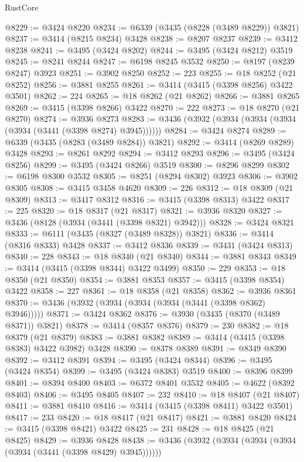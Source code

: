\begin{lexlean}{RustCore}
\begin{coremodule}
@8229 := @3424 @8220
@8234 := @6339 (@3435 (@8228 (@3489 @8229)) @3821)
@8237 := @3414 (@8215 @8234) @3428
@8238 := @8207 @8237
@8239 := @3412 @8238
@8241 := @3495 (@3424 @8202)
@8244 := @3495 (@3424 @8212) @3519
@8245 := @8241 @8244
@8247 := @6198 @8245 @3532
@8250 := @8197 (@8239 @8247) @3923
@8251 := @3902 @8250
@8252 := 223
@8255 := @18 @8252 (@21 @8252)
@8256 := @3881 @8255
@8261 := @3414 (@3415 (@3398 @8256) @3422 @3501)
@8262 := 224
@8265 := @18 @8262 (@21 @8262)
@8266 := @3881 @8265
@8269 := @3415 (@3398 @8266) @3422
@8270 := 222
@8273 := @18 @8270 (@21 @8270)
@8274 := @3936 @8273
@8283 := @3436 (@3932 (@3934 (@3934 (@3934 (@3934 (@3441 (@3398 @8274) @3945))))))
@8284 := @3424 @8274
@8289 := @6339 (@3435 (@8283 (@3489 @8284)) @3821)
@8292 := @3414 (@8269 @8289) @3428
@8293 := @8261 @8292
@8294 := @3412 @8293
@8296 := @3495 (@3424 @8256)
@8299 := @3495 (@3424 @8266) @3519
@8300 := @8296 @8299
@8302 := @6198 @8300 @3532
@8305 := @8251 (@8294 @8302) @3923
@8306 := @3902 @8305
@8308 := @3415 @3458 @4620
@8309 := 226
@8312 := @18 @8309 (@21 @8309)
@8313 := @3417 @8312
@8316 := @3415 (@3398 @8313) @3422
@8317 := 225
@8320 := @18 @8317 (@21 @8317)
@8321 := @3936 @8320
@8327 := @3436 (@8128 (@3934 (@3441 (@3398 @8321) @3942)))
@8328 := @3424 @8321
@8333 := @6111 (@3435 (@8327 (@3489 @8328)) @3821)
@8336 := @3414 (@8316 @8333) @3428
@8337 := @3412 @8336
@8339 := @3431 (@3424 @8313)
@8340 := 228
@8343 := @18 @8340 (@21 @8340)
@8344 := @3881 @8343
@8349 := @3414 (@3415 (@3398 @8344) @3422 @3499)
@8350 := 229
@8353 := @18 @8350 (@21 @8350)
@8354 := @3881 @8353
@8357 := @3415 (@3398 @8354) @3422
@8358 := 227
@8361 := @18 @8358 (@21 @8358)
@8362 := @3936 @8361
@8370 := @3436 (@3932 (@3934 (@3934 (@3934 (@3441 (@3398 @8362) @3946)))))
@8371 := @3424 @8362
@8376 := @3930 (@3435 (@8370 (@3489 @8371)) @3821)
@8378 := @3414 (@8357 @8376)
@8379 := 230
@8382 := @18 @8379 (@21 @8379)
@8383 := @3881 @8382
@8389 := @3414 (@3415 (@3398 @8383) @3422 @3982) @3428
@8390 := @8378 @8389
@8391 := @8349 @8390
@8392 := @3412 @8391
@8394 := @3495 (@3424 @8344)
@8396 := @3495 (@3424 @8354)
@8399 := @3495 (@3424 @8383) @3519
@8400 := @8396 @8399
@8401 := @8394 @8400
@8403 := @6372 @8401 @3532
@8405 := @4622 (@8392 @8403)
@8406 := @3495 @8405
@8407 := 232
@8410 := @18 @8407 (@21 @8407)
@8411 := @3881 @8410
@8416 := @3414 (@3415 (@3398 @8411) @3422 @3501)
@8417 := 233
@8420 := @18 @8417 (@21 @8417)
@8421 := @3881 @8420
@8424 := @3415 (@3398 @8421) @3422
@8425 := 231
@8428 := @18 @8425 (@21 @8425)
@8429 := @3936 @8428
@8438 := @3436 (@3932 (@3934 (@3934 (@3934 (@3934 (@3441 (@3398 @8429) @3945))))))

\end{coremodule}
\end{lexlean}
